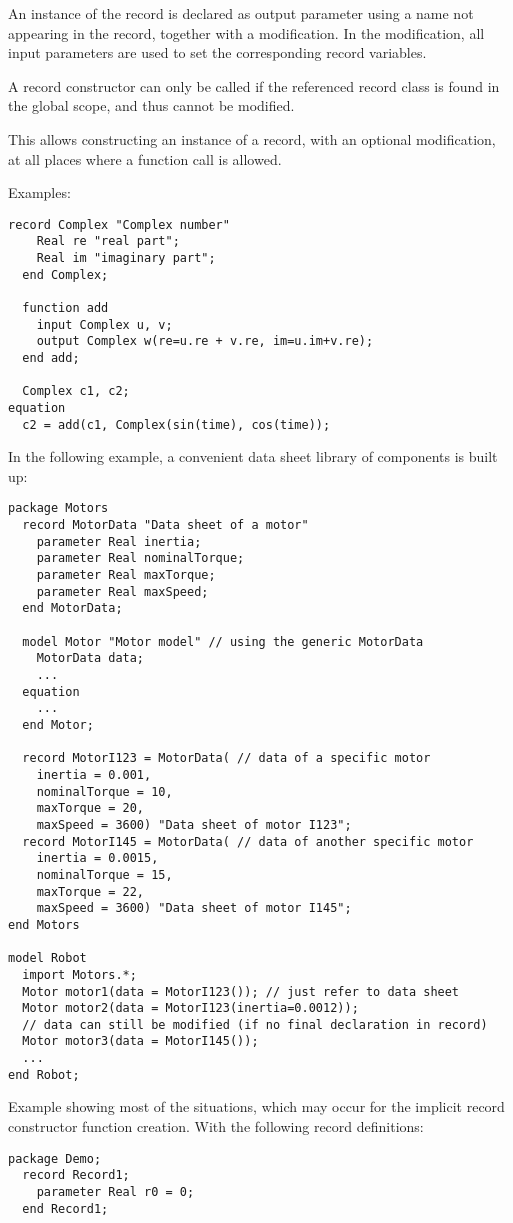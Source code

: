 An instance of the record is declared as output parameter using
a name not appearing in the record, together with a modification. In
the modification, all input parameters are used to set the corresponding
record variables.

A record constructor can only be called if the referenced record class
is found in the global scope, and thus cannot be modified.

\begin{nonnormative}
This allows constructing an instance of a record, with an
optional modification, at all places where a function call is allowed.

Examples:
\begin{lstlisting}[language=modelica]
  record Complex "Complex number"
    Real re "real part";
    Real im "imaginary part";
  end Complex;

  function add
    input Complex u, v;
    output Complex w(re=u.re + v.re, im=u.im+v.re);
  end add;

  Complex c1, c2;
equation
  c2 = add(c1, Complex(sin(time), cos(time));
\end{lstlisting}

In the following example, a convenient data sheet library of
components is built up:
\begin{lstlisting}[language=modelica]
package Motors
  record MotorData "Data sheet of a motor"
    parameter Real inertia;
    parameter Real nominalTorque;
    parameter Real maxTorque;
    parameter Real maxSpeed;
  end MotorData;

  model Motor "Motor model" // using the generic MotorData
    MotorData data;
    ...
  equation
    ...
  end Motor;

  record MotorI123 = MotorData( // data of a specific motor
    inertia = 0.001,
    nominalTorque = 10,
    maxTorque = 20,
    maxSpeed = 3600) "Data sheet of motor I123";
  record MotorI145 = MotorData( // data of another specific motor
    inertia = 0.0015,
    nominalTorque = 15,
    maxTorque = 22,
    maxSpeed = 3600) "Data sheet of motor I145";
end Motors

model Robot
  import Motors.*;
  Motor motor1(data = MotorI123()); // just refer to data sheet
  Motor motor2(data = MotorI123(inertia=0.0012));
  // data can still be modified (if no final declaration in record)
  Motor motor3(data = MotorI145());
  ...
end Robot;
\end{lstlisting}

Example showing most of the situations, which may occur for the
implicit record constructor function creation. With the following record
definitions:
\begin{lstlisting}[language=modelica]
package Demo;
  record Record1;
    parameter Real r0 = 0;
  end Record1;


\end{lstlisting}
\end{nonnormative}
